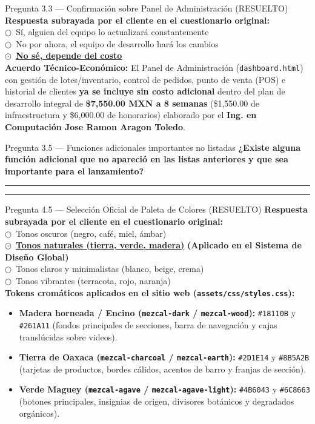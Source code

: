 \documentclass[11pt,letterpaper]{article}
\newcommand{\uradio}{$\bigcirc$}
\newcommand{\radio}{\textcolor{mezcalAgave}{\textbf{$\odot$}}}
\newcommand{\fillline}[1][1.0\linewidth]{%
    \par\vspace{0.35em}\noindent\textcolor{gray!70}{\rule{#1}{0.5pt}}\par\vspace{0.25em}%
}
\begin{document}
\begin{pendingbox}{Pregunta 3.3 — Confirmación sobre Panel de Administración (RESUELTO)}
\textbf{Respuesta subrayada por el cliente en el cuestionario original:}\\[0.4em]
\uradio\ Sí, alguien del equipo lo actualizará constantemente\\[0.25em]
\uradio\ No por ahora, el equipo de desarrollo hará los cambios\\[0.25em]
\radio\ \underline{\textbf{No sé, depende del costo}}\\[0.35em]
\textbf{Acuerdo Técnico-Económico:} El Panel de Administración (\texttt{dashboard.html}) con gestión de lotes/inventario, control de pedidos, punto de venta (POS) e historial de clientes \textbf{ya se incluye sin costo adicional} dentro del plan de desarrollo integral de \textbf{\$7,550.00 MXN a 8 semanas} (\$1,550.00 de infraestructura y \$6,000.00 de honorarios) elaborado por el \textbf{Ing. en Computación Jose Ramon Aragon Toledo}.
\end{pendingbox}

\begin{pendingbox}{Pregunta 3.5 — Funciones adicionales importantes no listadas}
\textbf{¿Existe alguna función adicional que no apareció en las listas anteriores y que sea importante para el lanzamiento?}
\fillline
\fillline
\end{pendingbox}

\begin{pendingbox}{Pregunta 4.5 — Selección Oficial de Paleta de Colores (RESUELTO)}
\textbf{Respuesta subrayada por el cliente en el cuestionario original:}\\[0.4em]
\uradio\ Tonos oscuros (negro, café, miel, ámbar)\\[0.2em]
\radio\ \underline{\textbf{Tonos naturales (tierra, verde, madera)}} \quad \textcolor{mezcalAgave}{\textbf{(Aplicado en el Sistema de Diseño Global)}}\\[0.2em]
\uradio\ Tonos claros y minimalistas (blanco, beige, crema)\\[0.2em]
\uradio\ Tonos vibrantes (terracota, rojo, naranja)\\[0.4em]
\textbf{Tokens cromáticos aplicados en el sitio web (\texttt{assets/css/styles.css}):}
\begin{itemize}[leftmargin=1.5em, topsep=2pt, itemsep=1pt]
    \item \textbf{Madera horneada / Encino (\texttt{mezcal-dark} / \texttt{mezcal-wood}):} \texttt{\#18110B} y \texttt{\#261A11} (fondos principales de secciones, barra de navegación y cajas translúcidas sobre videos).
    \item \textbf{Tierra de Oaxaca (\texttt{mezcal-charcoal} / \texttt{mezcal-earth}):} \texttt{\#2D1E14} y \texttt{\#8B5A2B} (tarjetas de productos, bordes cálidos, acentos de barro y franjas de sección).
    \item \textbf{Verde Maguey (\texttt{mezcal-agave} / \texttt{mezcal-agave-light}):} \texttt{\#4B6043} y \texttt{\#6C8663} (botones principales, insignias de origen, divisores botánicos y degradados orgánicos).
\end{itemize}
\end{pendingbox}
\end{document}
